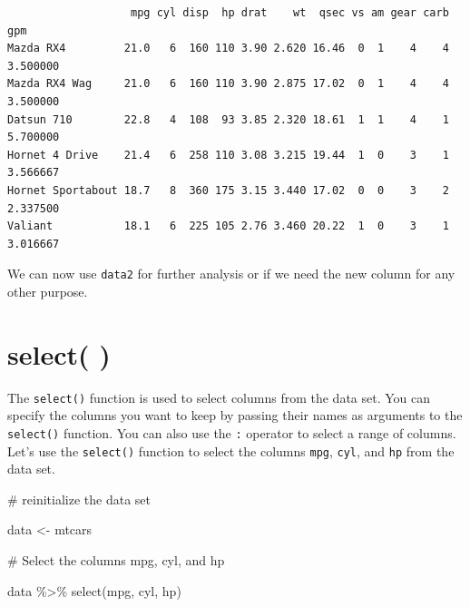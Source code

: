 \documentclass[
  letterpaper,
  DIV=11,
  numbers=noendperiod]{scrreprt}
\newenvironment{Shaded}{\begin{snugshade}}{\end{snugshade}}
\newcommand{\CommentTok}[1]{\textcolor[rgb]{0.37,0.37,0.37}{#1}}
\newcommand{\FunctionTok}[1]{\textcolor[rgb]{0.28,0.35,0.67}{#1}}
\newcommand{\NormalTok}[1]{\textcolor[rgb]{0.00,0.23,0.31}{#1}}
\newcommand{\OtherTok}[1]{\textcolor[rgb]{0.00,0.23,0.31}{#1}}
\newcommand{\SpecialCharTok}[1]{\textcolor[rgb]{0.37,0.37,0.37}{#1}}
\begin{document}
\begin{verbatim}
                   mpg cyl disp  hp drat    wt  qsec vs am gear carb      gpm
Mazda RX4         21.0   6  160 110 3.90 2.620 16.46  0  1    4    4 3.500000
Mazda RX4 Wag     21.0   6  160 110 3.90 2.875 17.02  0  1    4    4 3.500000
Datsun 710        22.8   4  108  93 3.85 2.320 18.61  1  1    4    1 5.700000
Hornet 4 Drive    21.4   6  258 110 3.08 3.215 19.44  1  0    3    1 3.566667
Hornet Sportabout 18.7   8  360 175 3.15 3.440 17.02  0  0    3    2 2.337500
Valiant           18.1   6  225 105 2.76 3.460 20.22  1  0    3    1 3.016667
\end{verbatim}

We can now use \texttt{data2} for further analysis or if we need the new
column for any other purpose.

\section*{select( )}\label{select}


The \texttt{select()} function is used to select columns from the data
set. You can specify the columns you want to keep by passing their names
as arguments to the \texttt{select()} function. You can also use the
\texttt{:} operator to select a range of columns. Let's use the
\texttt{select()} function to select the columns \texttt{mpg},
\texttt{cyl}, and \texttt{hp} from the data set.

\begin{Shaded}
\begin{Highlighting}[]
\CommentTok{\# reinitialize the data set}

\NormalTok{data }\OtherTok{\textless{}{-}}\NormalTok{ mtcars}

\CommentTok{\# Select the columns mpg, cyl, and hp}

\NormalTok{data }\SpecialCharTok{\%\textgreater{}\%}
  \FunctionTok{select}\NormalTok{(mpg, cyl, hp)}
\end{Highlighting}
\end{Shaded}
\end{document}
